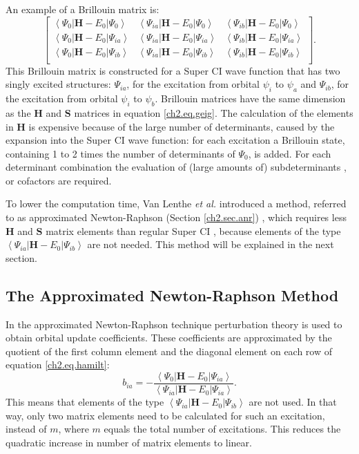 An example of a Brillouin matrix is:
\begin{equation}
\left[\begin{array}{ccc}
\left< \Psi_{0} | \mathbf{H}-E_0 | \Psi_{0} \right> & \left< \Psi_{ia} | \mathbf{H}-E_0 | \Psi_{0} \right> & \left< \Psi_{ib} | \mathbf{H}-E_0 | \Psi_{0} \right> \\
\left< \Psi_{0} | \mathbf{H}-E_0 | \Psi_{ia} \right> & \left< \Psi_{ia} | \mathbf{H}-E_0 | \Psi_{ia} \right> & \left< \Psi_{ib} | \mathbf{H}-E_0 | \Psi_{ia} \right> \\
\left< \Psi_{0} | \mathbf{H}-E_0 | \Psi_{ib} \right> & \left< \Psi_{ia} | \mathbf{H}-E_0 | \Psi_{ib} \right> & \left< \Psi_{ib} | \mathbf{H}-E_0 | \Psi_{ib} \right> \\
\end{array}\right].
\label{ch2.eq.hamilt}
\end{equation}
This Brillouin matrix is constructed for a Super CI wave function that has two singly excited structures: $\Psi_{ia}$, for the excitation from orbital $\psi_i$ to $\psi_a$ and $\Psi_{ib}$, for the excitation from orbital $\psi_i$ to $\psi_b$. Brillouin matrices have the same dimension as the $\mathbf{H}$ and $\mathbf{S}$ matrices in equation \ref{ch2.eq.geig}. The calculation of the elements in $\mathbf{H}$ is expensive because of the large number of determinants, caused by the expansion into the Super CI wave function: for each excitation a Brillouin state, containing 1 to 2 times the number of determinants of $\Psi_0$, is added. For each determinant combination the evaluation of (large amounts of) subdeterminants \cite{koos2}, or cofactors are required.

To lower the computation time, Van Lenthe \textit{et al.} introduced a method, referred to as approximated Newton-Raphson (Section \ref{ch2.sec.anr}) \cite{koos1}, which requires less $\mathbf{H}$ and $\mathbf{S}$ matrix elements than regular Super CI \cite{koos1}, because elements of the type $\left < \Psi_{ia} | \mathbf{H} - E_0 | \Psi_{ib} \right >$ are not needed. This method will be explained in the next section.

\subsection{\label{ch2.sec.anr}The Approximated Newton-Raphson Method}

In the approximated Newton-Raphson technique perturbation theory is used to obtain orbital update coefficients. These coefficients are approximated by the quotient of the first column element and the diagonal element on each row of equation \ref{ch2.eq.hamilt}:
\begin{equation}
b_{ia}= - \frac{\left< \Psi_{0} | \mathbf{H}-E_0 | \Psi_{ia} \right>}{\left< \Psi_{ia} | \mathbf{H}-E_0 | \Psi_{ia} \right>}.
\label{ch2.eq.anr}
\end{equation}
This means that elements of the type $\left< \Psi_{ia} | \mathbf{H}-E_0 | \Psi_{ib} \right>$ are not used. In that way, only two matrix elements need to be calculated for such an excitation, instead of $m$, where $m$ equals the total number of excitations. This reduces the quadratic increase in number of matrix elements to linear.


